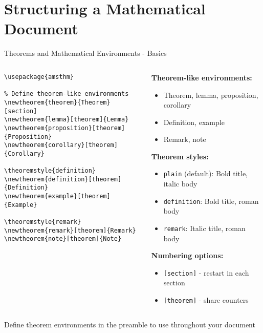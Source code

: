 
\section{Structuring a Mathematical Document}

\begin{frame}[fragile]{Theorems and Mathematical Environments - Basics}
     \begin{columns}
          \begin{column}{0.5\textwidth}
               \begin{lstlisting}[basicstyle=\footnotesize\ttfamily]
% In preamble
\usepackage{amsthm}

% Define theorem-like environments
\newtheorem{theorem}{Theorem}[section]
\newtheorem{lemma}[theorem]{Lemma}
\newtheorem{proposition}[theorem]{Proposition}
\newtheorem{corollary}[theorem]{Corollary}

\theoremstyle{definition}
\newtheorem{definition}[theorem]{Definition}
\newtheorem{example}[theorem]{Example}

\theoremstyle{remark}
\newtheorem{remark}[theorem]{Remark}
\newtheorem{note}[theorem]{Note}
               \end{lstlisting}
          \end{column}
          
          \begin{column}{0.5\textwidth}
               \textbf{Theorem-like environments:}
               \begin{itemize}
                    \item Theorem, lemma, proposition, corollary
                    \item Definition, example
                    \item Remark, note
               \end{itemize}
               
               \textbf{Theorem styles:}
               \begin{itemize}
                    \item \texttt{plain} (default): Bold title, italic body
                    \item \texttt{definition}: Bold title, roman body
                    \item \texttt{remark}: Italic title, roman body
               \end{itemize}
               
               \textbf{Numbering options:}
               \begin{itemize}
                    \item \texttt{[section]} - restart in each section
                    \item \texttt{[theorem]} - share counters
               \end{itemize}
          \end{column}
     \end{columns}
     
     \begin{tip}
          Define theorem environments in the preamble to use throughout your document
     \end{tip}
\end{frame}

